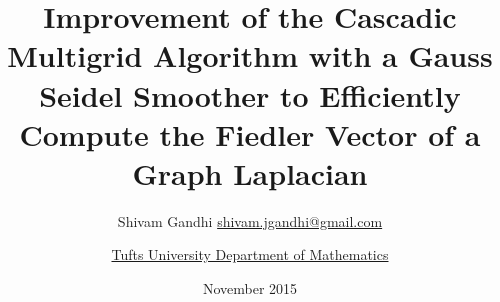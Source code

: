 \documentclass[a4paper]{article}
\begin{document}
\title{Improvement of the Cascadic Multigrid Algorithm with a Gauss Seidel
Smoother to Efficiently Compute the Fiedler Vector of a Graph Laplacian}
\author{Shivam Gandhi
  \href{mailto:shivam.jgandhi@gmail.com}{shivam.jgandhi@gmail.com}
  \and \href{http://math.tufts.edu/}{Tufts University Department of Mathematics}}
\date{November 2015}
\maketitle
\end{document}
